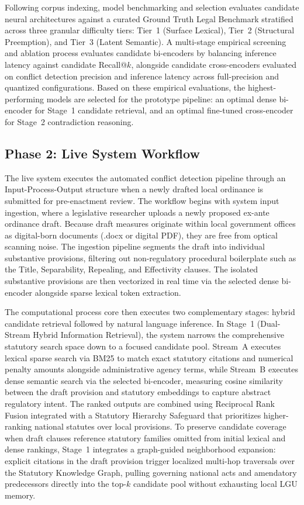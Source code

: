     Following corpus indexing, model benchmarking and selection evaluates candidate neural architectures against a curated Ground Truth Legal Benchmark stratified across three granular difficulty tiers: Tier~1 (Surface Lexical), Tier~2 (Structural Preemption), and Tier~3 (Latent Semantic). A multi-stage empirical screening and ablation process evaluates candidate bi-encoders by balancing inference latency against candidate Recall@$k$, alongside candidate cross-encoders evaluated on conflict detection precision and inference latency across full-precision and quantized configurations. Based on these empirical evaluations, the highest-performing models are selected for the prototype pipeline: an optimal dense bi-encoder for Stage~1 candidate retrieval, and an optimal fine-tuned cross-encoder for Stage~2 contradiction reasoning.

    \subsection{Phase 2: Live System Workflow}
    The live system executes the automated conflict detection pipeline through an Input-Process-Output structure when a newly drafted local ordinance is submitted for pre-enactment review. The workflow begins with system input ingestion, where a legislative researcher uploads a newly proposed ex-ante ordinance draft. Because draft measures originate within local government offices as digital-born documents (.docx or digital PDF), they are free from optical scanning noise. The ingestion pipeline segments the draft into individual substantive provisions, filtering out non-regulatory procedural boilerplate such as the Title, Separability, Repealing, and Effectivity clauses. The isolated substantive provisions are then vectorized in real time via the selected dense bi-encoder alongside sparse lexical token extraction.

    The computational process core then executes two complementary stages: hybrid candidate retrieval followed by natural language inference. In Stage~1 (Dual-Stream Hybrid Information Retrieval), the system narrows the comprehensive statutory search space down to a focused candidate pool. Stream~A executes lexical sparse search via BM25 to match exact statutory citations and numerical penalty amounts alongside administrative agency terms, while Stream~B executes dense semantic search via the selected bi-encoder, measuring cosine similarity between the draft provision and statutory embeddings to capture abstract regulatory intent. The ranked outputs are combined using Reciprocal Rank Fusion integrated with a Statutory Hierarchy Safeguard that prioritizes higher-ranking national statutes over local provisions. To preserve candidate coverage when draft clauses reference statutory families omitted from initial lexical and dense rankings, Stage~1 integrates a graph-guided neighborhood expansion: explicit citations in the draft provision trigger localized multi-hop traversals over the Statutory Knowledge Graph, pulling governing national acts and amendatory predecessors directly into the top-$k$ candidate pool without exhausting local LGU memory.

